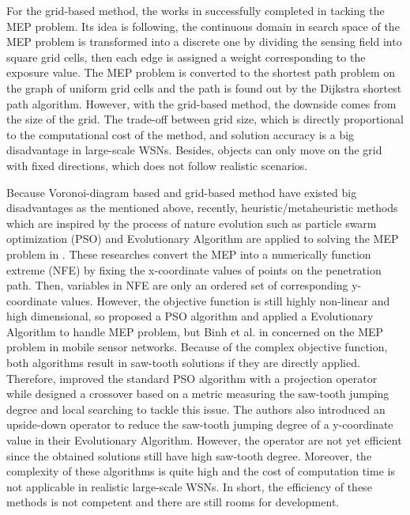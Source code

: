 \documentclass[final]{elsarticle}
\begin{document}
For the grid-based method, the works in \cite{meguerdichian2001exposure, veltri2003minimal,megerian2002exposure, b9, b10} successfully completed in tacking the MEP problem. Its idea is following, the continuous domain in search space of the MEP problem is transformed into a discrete one by dividing the sensing field into square grid cells, then each edge is assigned a weight corresponding to the exposure value. The MEP problem is converted to the shortest path problem on the graph of uniform grid cells and the path is found out by the Dijkstra shortest path algorithm. However, with the grid-based method, the downside comes from the size of the grid. The trade-off between grid size, which is directly proportional to the computational cost of the method, and solution accuracy is a big disadvantage in large-scale WSNs. Besides, objects can only move on the grid with fixed directions, which does not follow realistic scenarios.

Because Voronoi-diagram based and grid-based method have existed big disadvantages as the mentioned above, recently, heuristic/metaheuristic methods which are inspired by the process of nature evolution such as particle swarm optimization (PSO) and Evolutionary Algorithm are applied to solving the MEP problem in \cite{b11,b12,b25,binh2019efficient}. These researches convert the MEP into a numerically function extreme (NFE) \cite{b8} by fixing the x-coordinate values of points on the penetration path. Then, variables in NFE are only an ordered set of corresponding y-coordinate values. However, the objective function is still highly non-linear and high dimensional, so \cite{b11} proposed a PSO algorithm and \cite {b12,b25,binh2019efficient} applied a Evolutionary Algorithm to handle MEP problem, but Binh et al. in \cite{b25} concerned on the MEP problem in mobile sensor networks. Because of the complex objective function, both algorithms result in saw-tooth solutions if they are directly applied. Therefore, \cite{b11} improved the standard PSO algorithm with a projection operator while \cite{binh2019efficient} designed a crossover based on a metric measuring the saw-tooth jumping degree and local searching to tackle this issue. The authors \cite{b12} also introduced an upside-down operator to reduce the saw-tooth jumping degree of a y-coordinate value in their Evolutionary Algorithm. However, the operator are not yet efficient since the obtained solutions still have high saw-tooth degree. Moreover, the complexity of these algorithms is quite high and the cost of computation time is not applicable in realistic large-scale WSNs. In short, the efficiency of these methods is not competent and there are still rooms for development.
\end{document}
